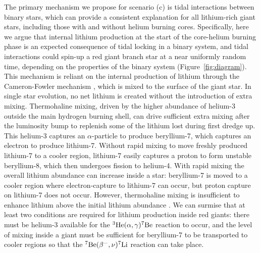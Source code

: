 \documentclass[twocolumn]{aastex62}
\begin{document}
The primary mechanism we propose for scenario (c) is tidal interactions between binary stars,
which can provide a consistent explanation for all
lithium-rich giant stars, including those with and without helium burning cores. 
Specifically, here we argue that internal lithium production at the start of the core-helium burning phase 
is an expected consequence of tidal locking in a binary system,
and tidal interactions could spin-up a red giant branch star at a near uniformly random time, depending on the properties of the binary system (Figure~\ref{fig:diagram}).
This mechanism is reliant on the internal production of lithium 
through the Cameron-Fowler mechanism \citep{Cameron_1971}, 
which is mixed to the surface of the giant star. In single star evolution, no net lithium is created without the introduction of extra
mixing.  Thermohaline mixing, driven by the higher abundance of helium-3 outside the main hydrogen burning shell, can drive sufficient extra mixing after the luminosity bump to replenish some of the lithium lost during first dredge up. This helium-3 captures an $\alpha$-particle to produce 
beryllium-7, which captures an electron to produce lithium-7. Without rapid mixing to move 
freshly  produced lithium-7 to a cooler region, lithium-7 easily captures a proton to 
form unstable beryllium-8, which then undergoes fission to helium-4. With rapid mixing 
the overall lithium abundance can increase inside a star: beryllium-7 is moved to a 
cooler region where electron-capture to lithium-7 can occur, but proton capture on 
lithium-7 does not occur. However, thermohaline mixing is insufficient to enhance lithium above the initial lithium abundance \citep{Lattanzio_2014}.
We can surmise that at least two conditions are required for lithium production inside red giants: there must be helium-3 available for the $^3{\rm He}(\alpha,\gamma)^7{\rm Be}$ reaction to occur, and the level of mixing inside a giant must be sufficient for beryllium-7 to be transported to cooler regions so that the $^7{\rm Be}(\beta^{-},\nu)^7{\rm Li}$ reaction can take place. 
\end{document}
